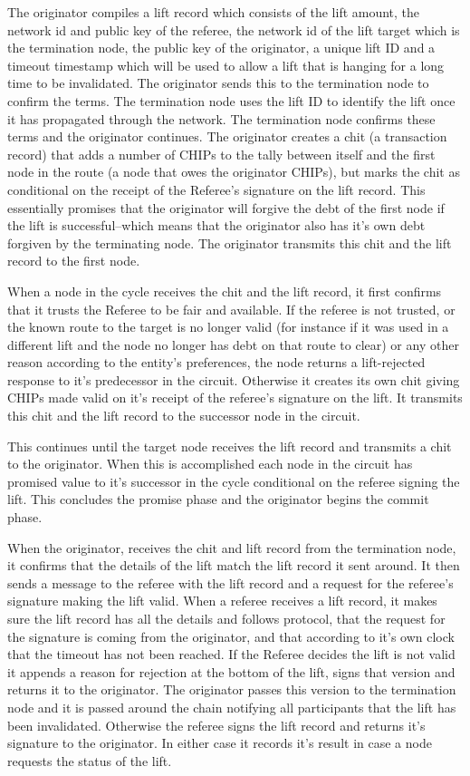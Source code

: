 \documentclass[article, onecolumn, 12pt]{IEEEtran}
\begin{document}
The originator compiles a lift record which consists of the lift amount, the network id and public key of the referee, the network id of the lift target which is the termination node, the public key of the originator, a unique lift ID and a timeout timestamp which will be used to allow a lift that is hanging for a long time to be invalidated. The originator sends this to the termination node to confirm the terms. The termination node uses the lift ID to identify the lift once it has propagated through the network. The termination node confirms these terms and the originator continues. The originator creates a chit (a transaction record) that adds a number of CHIPs to the tally between itself and the first node in the route (a node that owes the originator CHIPs), but marks the chit as conditional on the receipt of the Referee's signature on the lift record. This essentially promises that the originator will forgive the debt of the first node if the lift is successful--which means that the originator also has it's own debt forgiven by the terminating node. The originator transmits this chit and the lift record to the first node.

When a node in the cycle receives the chit and the lift record, it first confirms that it trusts the Referee to be fair and available. If the referee is not trusted, or the known route to the target is no longer valid (for instance if it was used in a different lift and the node no longer has debt on that route to clear) or any other reason according to the entity's preferences, the node returns a lift-rejected response to it's predecessor in the circuit. Otherwise it creates its own chit giving CHIPs made valid on it's receipt of the referee's signature on the lift. It transmits this chit and the lift record to the successor node in the circuit.

This continues until the target node receives the lift record and transmits a chit to the originator. When this is accomplished each node in the circuit has promised value to it's successor in the cycle conditional on the referee signing the lift. This concludes the promise phase and the originator begins the commit phase.

When the originator, receives the chit and lift record from the termination node, it confirms that the details of the lift match the lift record it sent around. It then sends a message to the referee with the lift record and a request for the referee's signature making the lift valid. When a referee receives a lift record, it makes sure the lift record has all the details and follows protocol, that the request for the signature is coming from the originator, and that according to it's own clock that the timeout has not been reached. If the Referee decides the lift is not valid it appends a reason for rejection at the bottom of the lift, signs that version and returns it to the originator. The originator passes this version to the termination node and it is passed around the chain notifying all participants that the lift has been invalidated. Otherwise the referee signs the lift record and returns it's signature to the originator. In either case it records it's result in case a node requests the status of the lift.
\end{document}
